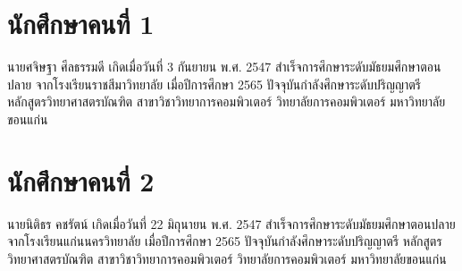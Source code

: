 
\section*{นักศึกษาคนที่ 1}

นายศจิษฐา ศีลธรรมดี เกิดเมื่อวันที่ 3 กันยายน พ.ศ. 2547
สำเร็จการศึกษาระดับมัธยมศึกษาตอนปลาย จากโรงเรียนราชสีมาวิทยาลัย เมื่อปีการศึกษา 2565
ปัจจุบันกำลังศึกษาระดับปริญญาตรี หลักสูตรวิทยาศาสตรบัณฑิต
สาขาวิชาวิทยาการคอมพิวเตอร์ วิทยาลัยการคอมพิวเตอร์ มหาวิทยาลัยขอนแก่น

\section*{นักศึกษาคนที่ 2}

นายนิติธร คชรัตน์ เกิดเมื่อวันที่ 22 มิถุนายน พ.ศ. 2547
สำเร็จการศึกษาระดับมัธยมศึกษาตอนปลาย จากโรงเรียนแก่นนครวิทยาลัย เมื่อปีการศึกษา 2565
ปัจจุบันกำลังศึกษาระดับปริญญาตรี หลักสูตรวิทยาศาสตรบัณฑิต
สาขาวิชาวิทยาการคอมพิวเตอร์ วิทยาลัยการคอมพิวเตอร์ มหาวิทยาลัยขอนแก่น
